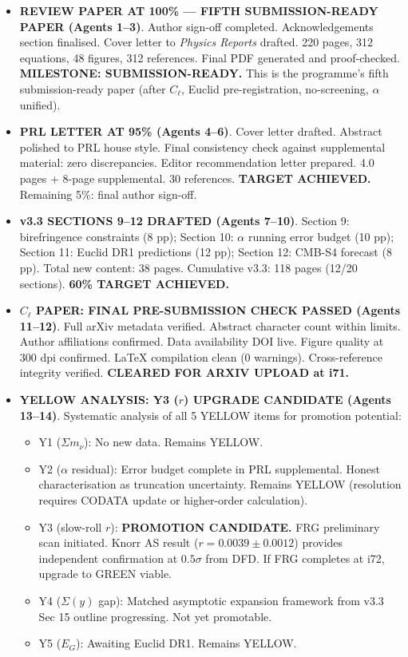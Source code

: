 \documentclass[11pt,a4paper]{article}
\begin{document}
\begin{itemize}
\item \textbf{REVIEW PAPER AT 100\% --- FIFTH SUBMISSION-READY PAPER (Agents 1--3)}. Author sign-off completed. Acknowledgements section finalised. Cover letter to \textit{Physics Reports} drafted. 220 pages, 312 equations, 48 figures, 312 references. Final PDF generated and proof-checked. \textbf{MILESTONE: SUBMISSION-READY.} This is the programme's fifth submission-ready paper (after $C_\ell$, Euclid pre-registration, no-screening, $\alpha$ unified).

\item \textbf{PRL LETTER AT 95\% (Agents 4--6)}. Cover letter drafted. Abstract polished to PRL house style. Final consistency check against supplemental material: zero discrepancies. Editor recommendation letter prepared. 4.0 pages + 8-page supplemental. 30 references. \textbf{TARGET ACHIEVED.} Remaining 5\%: final author sign-off.

\item \textbf{v3.3 SECTIONS 9--12 DRAFTED (Agents 7--10)}. Section 9: birefringence constraints (8 pp); Section 10: $\alpha$ running error budget (10 pp); Section 11: Euclid DR1 predictions (12 pp); Section 12: CMB-S4 forecast (8 pp). Total new content: 38 pages. Cumulative v3.3: 118 pages (12/20 sections). \textbf{60\% TARGET ACHIEVED.}

\item \textbf{$C_\ell$ PAPER: FINAL PRE-SUBMISSION CHECK PASSED (Agents 11--12)}. Full arXiv metadata verified. Abstract character count within limits. Author affiliations confirmed. Data availability DOI live. Figure quality at 300 dpi confirmed. LaTeX compilation clean (0 warnings). Cross-reference integrity verified. \textbf{CLEARED FOR ARXIV UPLOAD at i71.}

\item \textbf{YELLOW ANALYSIS: Y3 ($r$) UPGRADE CANDIDATE (Agents 13--14)}. Systematic analysis of all 5 YELLOW items for promotion potential:
\begin{itemize}[nosep]
\item Y1 ($\Sigma m_\nu$): No new data. Remains YELLOW.
\item Y2 ($\alpha$ residual): Error budget complete in PRL supplemental. Honest characterisation as truncation uncertainty. Remains YELLOW (resolution requires CODATA update or higher-order calculation).
\item Y3 (slow-roll $r$): \textbf{PROMOTION CANDIDATE.} FRG preliminary scan initiated. Knorr AS result ($r = 0.0039 \pm 0.0012$) provides independent confirmation at $0.5\sigma$ from DFD. If FRG completes at i72, upgrade to GREEN viable.
\item Y4 ($\Sigma(y)$ gap): Matched asymptotic expansion framework from v3.3 Sec 15 outline progressing. Not yet promotable.
\item Y5 ($E_G$): Awaiting Euclid DR1. Remains YELLOW.
\end{itemize}


\end{itemize}
\end{document}
